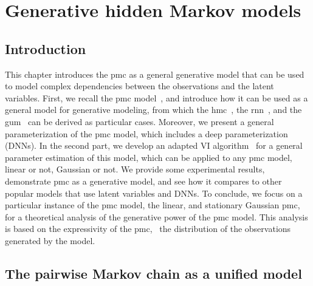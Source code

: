 \chapter{Generative hidden  Markov models}
\label{chap:pmc}

\localtableofcontents
\pagebreak

\section{Introduction}
This chapter introduces the \gls*{pmc} as a general
generative model that can be used to model
complex dependencies between the observations and the latent variables.
First, we recall  the 
\gls*{pmc} model~\citep{pieczynski2003pairwise}, 
and introduce how it can be used as a general model for generative modeling, 
from which the \gls*{hmc}~\citep{rabiner1989tutorial}, the \gls*{rnn}~\citep{medsker2001recurrent},
and the \gls*{gum}~\citep{salaun2019comparing} can be derived as particular cases.
Moreover, we present a general parameterization of the \gls*{pmc} model, 
which includes a deep parameterization (DNNs).
In the second part, we develop an adapted VI
 algorithm~\citep{jaakkola2000bayesian,Blei_2017}
for a general parameter estimation of this model, 
which can be applied to any \gls*{pmc} model, linear or not, Gaussian or not.
We provide some experimental results, 
demonstrate \gls*{pmc} as a generative model, 
and see how it compares to other popular models 
that use latent variables and DNNs.
To conclude, we  focus on a particular instance of the \gls*{pmc} model,
the linear, and stationary Gaussian \gls*{pmc}, 
for a theoretical analysis of the generative power of the \gls*{pmc} model.
This analysis is based on the expressivity 
of the \gls*{pmc}, 
\ie~the distribution of the observations generated by the model.



\section{The pairwise Markov chain as a unified model}
\label{sec:pmc_unified_model}

